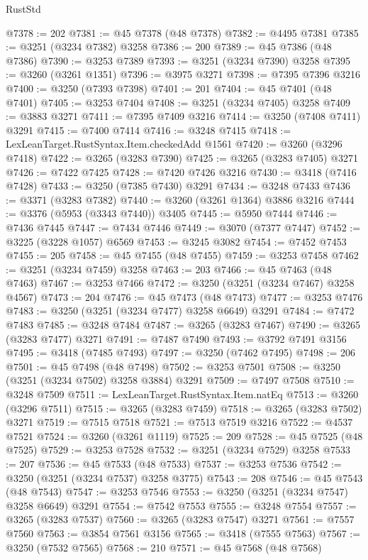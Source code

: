 \begin{lexlean}{RustStd}
\begin{coremodule}
@7378 := 202
@7381 := @45 @7378 (@48 @7378)
@7382 := @4495 @7381
@7385 := @3251 (@3234 @7382) @3258
@7386 := 200
@7389 := @45 @7386 (@48 @7386)
@7390 := @3253 @7389
@7393 := @3251 (@3234 @7390) @3258
@7395 := @3260 (@3261 @1351)
@7396 := @3975 @3271
@7398 := @7395 @7396 @3216
@7400 := @3250 (@7393 @7398)
@7401 := 201
@7404 := @45 @7401 (@48 @7401)
@7405 := @3253 @7404
@7408 := @3251 (@3234 @7405) @3258
@7409 := @3883 @3271
@7411 := @7395 @7409 @3216
@7414 := @3250 (@7408 @7411) @3291
@7415 := @7400 @7414
@7416 := @3248 @7415
@7418 := LexLeanTarget.RustSyntax.Item.checkedAdd @1561
@7420 := @3260 (@3296 @7418)
@7422 := @3265 (@3283 @7390)
@7425 := @3265 (@3283 @7405) @3271
@7426 := @7422 @7425
@7428 := @7420 @7426 @3216
@7430 := @3418 (@7416 @7428)
@7433 := @3250 (@7385 @7430) @3291
@7434 := @3248 @7433
@7436 := @3371 (@3283 @7382)
@7440 := @3260 (@3261 @1364) @3886 @3216
@7444 := @3376 (@5953 (@3343 @7440)) @3405
@7445 := @5950 @7444
@7446 := @7436 @7445
@7447 := @7434 @7446
@7449 := @3070 (@7377 @7447)
@7452 := @3225 (@3228 @1057) @6569
@7453 := @3245 @3082
@7454 := @7452 @7453
@7455 := 205
@7458 := @45 @7455 (@48 @7455)
@7459 := @3253 @7458
@7462 := @3251 (@3234 @7459) @3258
@7463 := 203
@7466 := @45 @7463 (@48 @7463)
@7467 := @3253 @7466
@7472 := @3250 (@3251 (@3234 @7467) @3258 @4567)
@7473 := 204
@7476 := @45 @7473 (@48 @7473)
@7477 := @3253 @7476
@7483 := @3250 (@3251 (@3234 @7477) @3258 @6649) @3291
@7484 := @7472 @7483
@7485 := @3248 @7484
@7487 := @3265 (@3283 @7467)
@7490 := @3265 (@3283 @7477) @3271
@7491 := @7487 @7490
@7493 := @3792 @7491 @3156
@7495 := @3418 (@7485 @7493)
@7497 := @3250 (@7462 @7495)
@7498 := 206
@7501 := @45 @7498 (@48 @7498)
@7502 := @3253 @7501
@7508 := @3250 (@3251 (@3234 @7502) @3258 @3884) @3291
@7509 := @7497 @7508
@7510 := @3248 @7509
@7511 := LexLeanTarget.RustSyntax.Item.natEq
@7513 := @3260 (@3296 @7511)
@7515 := @3265 (@3283 @7459)
@7518 := @3265 (@3283 @7502) @3271
@7519 := @7515 @7518
@7521 := @7513 @7519 @3216
@7522 := @4537 @7521
@7524 := @3260 (@3261 @1119)
@7525 := 209
@7528 := @45 @7525 (@48 @7525)
@7529 := @3253 @7528
@7532 := @3251 (@3234 @7529) @3258
@7533 := 207
@7536 := @45 @7533 (@48 @7533)
@7537 := @3253 @7536
@7542 := @3250 (@3251 (@3234 @7537) @3258 @3775)
@7543 := 208
@7546 := @45 @7543 (@48 @7543)
@7547 := @3253 @7546
@7553 := @3250 (@3251 (@3234 @7547) @3258 @6649) @3291
@7554 := @7542 @7553
@7555 := @3248 @7554
@7557 := @3265 (@3283 @7537)
@7560 := @3265 (@3283 @7547) @3271
@7561 := @7557 @7560
@7563 := @3854 @7561 @3156
@7565 := @3418 (@7555 @7563)
@7567 := @3250 (@7532 @7565)
@7568 := 210
@7571 := @45 @7568 (@48 @7568)

\end{coremodule}
\end{lexlean}
